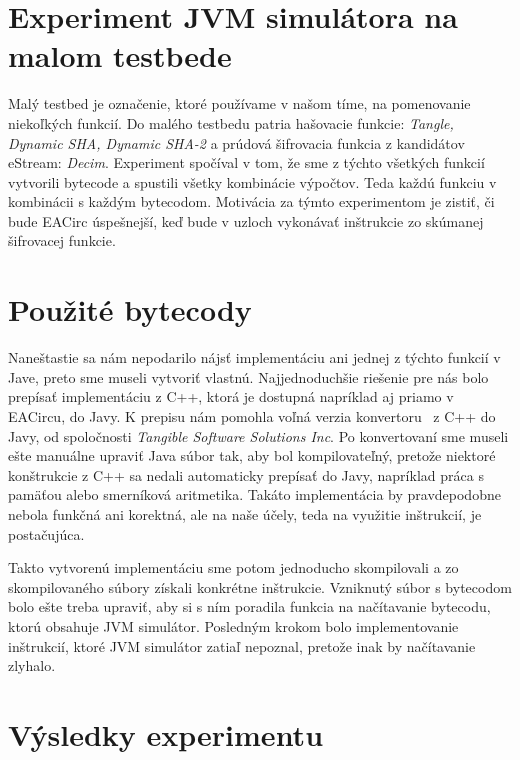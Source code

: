 \section{Experiment JVM simulátora na malom testbede}
\label{sec:exp2}

Malý testbed je označenie, ktoré používame v našom tíme, na pomenovanie niekoľkých funkcií. Do malého testbedu patria hašovacie funkcie: \textit{Tangle, Dynamic SHA, Dynamic SHA-2} a prúdová šifrovacia funkcia z kandidátov eStream: \textit{Decim}. Experiment spočíval v tom, že sme z týchto všetkých funkcií vytvorili bytecode a spustili všetky kombinácie výpočtov. Teda každú funkciu v kombinácii s každým bytecodom. Motivácia za týmto experimentom je zistiť, či bude EACirc úspešnejší, keď bude v uzloch vykonávať inštrukcie zo skúmanej šifrovacej funkcie. 

\section{Použité bytecody}
\label{sec:exp2-bytecode}

Naneštastie sa nám nepodarilo nájsť implementáciu ani jednej z týchto funkcií v Jave, preto sme museli vytvoriť vlastnú. Najjednoduchšie riešenie pre nás bolo prepísať implementáciu z C++, ktorá je dostupná napríklad aj priamo v EACircu, do Javy. K prepisu nám pomohla voľná verzia  konvertoru~\parencite{c++-java-converter} z C++ do Javy, od spoločnosti \textit{Tangible Software Solutions Inc}. Po konvertovaní sme museli ešte manuálne upraviť Java súbor tak, aby bol kompilovateľný, pretože niektoré konštrukcie z C++ sa nedali automaticky prepísať do Javy, napríklad práca s pamäťou alebo smerníková aritmetika. Takáto implementácia by pravdepodobne nebola funkčná ani korektná, ale na naše účely, teda na využitie inštrukcií, je postačujúca. 

Takto vytvorenú implementáciu sme potom jednoducho skompilovali a zo skompilovaného súbory získali konkrétne inštrukcie. Vzniknutý súbor s bytecodom bolo ešte treba upraviť, aby si s ním poradila funkcia na načítavanie bytecodu, ktorú obsahuje JVM simulátor. Posledným krokom bolo implementovanie inštrukcií, ktoré JVM simulátor zatiaľ nepoznal, pretože inak by načítavanie zlyhalo.

\section{Výsledky experimentu}
\label{sec:exp2-results}

